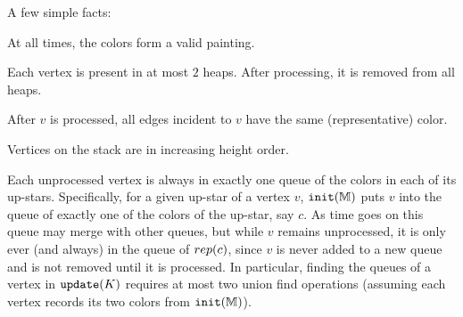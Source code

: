 \medskip
{}

\bigskip

A few simple facts:
\begin{compactitem}
	\item At all times, the colors form a valid painting.
	\item Each vertex is present in at most $2$ heaps. After processing, it is removed from all heaps.
	\item After $v$ is processed, all edges incident to $v$ have the same (representative) color. %
	\item Vertices on the stack are in increasing height order. 
\end{compactitem}

\begin{observation}
\label{obs:twoQueues}
 Each unprocessed vertex is always in exactly one queue of the colors in each of its up-stars.  Specifically, 
 for a given up-star of a vertex $v$, ${\tt init}(\mathbb{M})$ puts $v$ into the queue of exactly one of the colors of the up-star, say $c$.  As time goes on this queue 
 may merge with other queues, but while $v$ remains unprocessed, it is only ever (and always) in the queue of $rep(c)$,  
 since $v$ is never added to a new queue and is not removed until it is processed.  
 In particular, finding the queues of a vertex in ${\tt update}(K)$ requires at most two union find operations (assuming each vertex records its two colors from ${\tt init}(\mathbb{M})$).
\end{observation}


